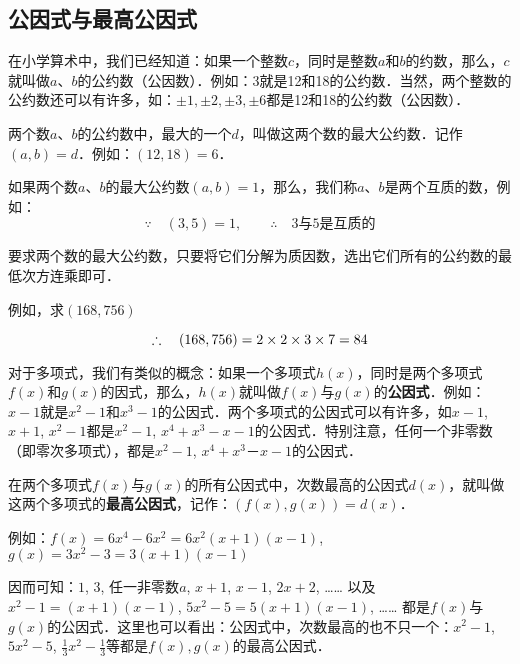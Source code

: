 \subsection{公因式与最高公因式}
在小学算术中，我们已经知道：如果一个整数$c$，同时是整数$a$和$b$的约数，那么，$c$就叫做$a$、$b$的公约数（公因数）．例如：3就是12和18的公约数．当然，两个整数的公约数还可以有许多，如：$\pm 1,\pm 2,\pm 3,\pm 6$都是12和18的公约数（公因数）．

两个数$a$、$b$的公约数中，最大的一个$d$，叫做这两个数的最大公约数．记作$(a,b)=d$．例如：$(12, 18)=6$．

如果两个数$a$、$b$的最大公约数$(a,b)=1$，那么，我们称$a$、$b$是两个互质的数，例如：
\[\because\quad (3,5)=1,\qquad \therefore\quad \text{3与5是互质的}\]

要求两个数的最大公约数，只要将它们分解为质因数，选出它们所有的公约数的最低次方连乘即可．

例如，求$(168,756)$
\begin{center}
\end{center}
\[\therefore \quad (168, 756)=2\times 2\times 3\times 7=84\]

对于多项式，我们有类似的概念：如果一个多项式$h(x)$，同时是两个多项式$f(x)$和$g(x)$的因式，那么，$h(x)$就叫做$f(x)$与$g(x)$的\textbf{公因式}．例如：$x-1$就是$x^2-1$和$x^3-1$的公因式．两个多项式的公因式可以有许多，如$x-1$, $x+1$, $x^2-1$都是$x^2-1$, $x^4+x^3-x-1$的公因式．特别注意，任何一个非零数（即零次多项式），都是$x^2-1$, $x^4+x^3－x-1$的公因式．

在两个多项式$f(x)$与$g(x)$的所有公因式中，次数最高的公因式$d(x)$，就叫做这两个多项式的\textbf{最高公因式}，记作：$(f(x),g(x))=d(x)$．

例如：$f(x)=6x^4-6x^2=6x^2(x+1)(x-1)$, 
$g (x) =3x^2-3=3 (x+1) (x-1)$

因而可知：$1$, $3$, 任一非零数$a$, $x+1$, $x-1$, $2x+2$, …… 以及$x^2-1=(x+1)(x-1)$, $5x^2-5=5(x+1)(x-1)$, …… 都是$f(x)$与$g(x)$的公因式．这里也可以看出：公因式中，次数最高的也不只一个：$x^2-1$,$5x^2-5$, $\frac{1}{3}x^2-\frac{1}{3}$等都是$f(x),g(x)$的最高公因式．

